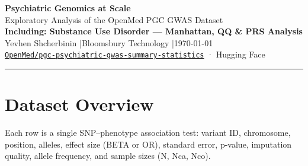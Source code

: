 \documentclass[11pt, a4paper]{article}
\begin{document}
\begin{center}
  {\LARGE\bfseries\color{accent} Psychiatric Genomics at Scale}\\[4pt]
  {\large Exploratory Analysis of the OpenMed PGC GWAS Dataset}\\[3pt]
  {\normalsize\color{sudcol}\bfseries Including: Substance Use Disorder — Manhattan, QQ \& PRS Analysis}\\[10pt]
  {\normalsize Yevhen Shcherbinin \quad|\quad Bloomsbury Technology \quad|\quad \today}\\[2pt]
  {\small\color{muted}
    \href{https://huggingface.co/collections/OpenMed/pgc-psychiatric-gwas-summary-statistics}%
    {\texttt{OpenMed/pgc-psychiatric-gwas-summary-statistics}} · Hugging Face}
\end{center}
\vspace{4pt}\hrule\vspace{14pt}

\begin{abstract}
\noindent
OpenMed has standardised all Psychiatric Genomics Consortium (PGC) GWAS
meta-analyses into a single Hugging Face collection: \textbf{1.14 billion rows},
\textbf{12 psychiatric conditions}, \textbf{52 landmark studies}. This report
presents schema profiling, allele frequency characterisation, cross-disorder
genetic effect correlations across 489,904 shared SNPs, and an extended analysis
of the \textbf{Substance Use Disorder (SUD2023)} sub-study including Manhattan
and QQ plots ($\lambda_\text{GC} = 1.492$, 13 genome-wide significant hits
in sample), cross-disorder correlation profile, and a polygenic risk score
simulation under the liability-threshold model.
\end{abstract}
\vspace{8pt}

\section{Dataset Overview}

Each row is a single SNP--phenotype association test: variant ID, chromosome,
position, alleles, effect size (BETA or OR), standard error, p-value, imputation
quality, allele frequency, and sample sizes (N, Nca, Nco).
\end{document}
